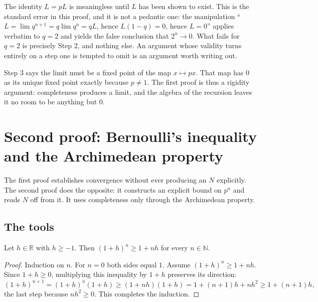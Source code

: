 \documentclass{essay}
\begin{document}
\begin{remark}\label{rem:error}
The identity $L = pL$ is meaningless until $L$ has been shown to exist. This is the
standard error in this proof, and it is not a pedantic one: the manipulation
``$L = \lim q^{n+1} = q \lim q^{n} = qL$, hence $L(1-q) = 0$, hence $L = 0$'' applies
verbatim to $q = 2$ and yields the false conclusion that $2^{n} \to 0$. What fails
for $q = 2$ is precisely Step 2, and nothing else. An argument whose validity turns
entirely on a step one is tempted to omit is an argument worth writing out.
\end{remark}

\begin{remark}
Step 3 says the limit must be a fixed point of the map $x \mapsto px$. That map has
$0$ as its unique fixed point exactly because $p \neq 1$. The first proof is thus a
rigidity argument: completeness produces a limit, and the algebra of the recursion
leaves it no room to be anything but $0$.
\end{remark}

\section{Second proof: Bernoulli's inequality and the Archimedean property}

The first proof establishes convergence without ever producing an $N$ explicitly.
The second proof does the opposite: it constructs an explicit bound on $p^{n}$ and
reads $N$ off from it. It uses completeness only through the Archimedean property.

\subsection{The tools}

\begin{lemma}\label{lem:bernoulli}
Let $h \in \mathbb{R}$ with $h \geq -1$. Then $(1+h)^{n} \geq 1 + nh$ for every
$n \in \mathbb{N}$.
\end{lemma}

\begin{proof}
Induction on $n$. For $n = 0$ both sides equal $1$. Assume $(1+h)^{n} \geq 1 + nh$.
Since $1 + h \geq 0$, multiplying this inequality by $1 + h$ preserves its direction:
\[
  (1+h)^{n+1} = (1+h)^{n}(1+h) \geq (1 + nh)(1 + h)
  = 1 + (n+1)h + nh^{2} \geq 1 + (n+1)h,
\]
the last step because $nh^{2} \geq 0$. This completes the induction.
\end{proof}
\end{document}
